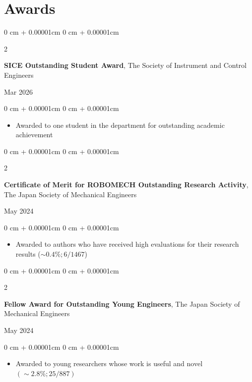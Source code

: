 \documentclass[11pt, letterpaper]{article}
\newenvironment{highlights}{
    \begin{itemize}[
        topsep=0.0cm,
        parsep=0.0cm,
        partopsep=0pt,
        itemsep=0pt,
        leftmargin=10pt
    ]
}{
    \end{itemize}
} %
\newenvironment{onecolentry}{
    \begin{adjustwidth}{
        0 cm + 0.00001cm
    }{
        0 cm + 0.00001cm
    }
}{
    \end{adjustwidth}
} %
\newenvironment{twocolentry}[2][]{
    \onecolentry
    \def\secondColumn{#2}
    \setcolumnwidth{\fill, 3.5cm}
    \begin{paracol}{2}
}{
    \switchcolumn \raggedleft \secondColumn
    \end{paracol}
    \endonecolentry
} %
\begin{document}
    \section{Awards}
      \begin{samepage}
        \begin{twocolentry}{Mar 2026}
          \textbf{SICE Outstanding Student Award}, The Society of Instrument and Control Engineers
        \end{twocolentry}
        \vspace{0.10 cm}
        \begin{onecolentry}
          \begin{highlights}
            \item Awarded to one student in the department for outstanding academic achievement
          \end{highlights}
        \end{onecolentry}
      \end{samepage}
      \vspace{0.25cm}
      \begin{samepage}
        \begin{twocolentry}{May 2024}
          \textbf{Certificate of Merit for ROBOMECH Outstanding Research Activity}, The Japan Society of Mechanical Engineers
        \end{twocolentry}
        \vspace{0.10 cm}
        \begin{onecolentry}
          \begin{highlights}
            \item Awarded to authors who have received high evaluations for their research results (\(\sim 0.4\%; 6/1467\))
          \end{highlights}
        \end{onecolentry}
      \end{samepage}
      \vspace{0.25cm}
      \begin{samepage}
        \begin{twocolentry}{May 2024}
          \textbf{Fellow Award for Outstanding Young Engineers}, The Japan Society of Mechanical Engineers
        \end{twocolentry}
        \vspace{0.10 cm}
        \begin{onecolentry}
          \begin{highlights}
            \item Awarded to young researchers whose work is useful and novel \((\sim 2.8\%; 25/887)\)
          \end{highlights}
        \end{onecolentry}
      \end{samepage}
\end{document}
